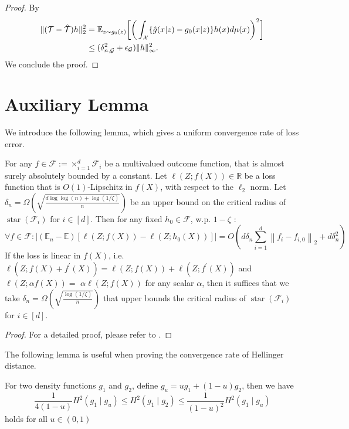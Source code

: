 \begin{proof}
By
    \begin{align*}
    \|({\mathcal{T}} - \hat{{\mathcal{T}}}) h\|_2^2 &= \mathbb{E}_{z\sim g_0(z)}\bigg[\bigg(\int_{\mathcal{X}} \{\hat{g}(x|z) - g_0(x| z)\}h(x)d\mu(x)\bigg)^2\bigg]\\
    &\leq (\delta_{n,\mathcal{G}}^2+\epsilon_{\mathcal{G}}) \|h\|_\infty^2 .
\end{align*}
We conclude the proof.
\end{proof}
\section{Auxiliary Lemma}
We introduce the following lemma, which gives a uniform convergence rate of loss error.
\begin{lemma}\label{lem:local-concen}
For any $f \in \mathcal{F}:=\times_{i=1}^d \mathcal{F}_i$ be a multivalued outcome function, that is almost surely absolutely bounded by a constant. Let $\ell(Z ; f(X)) \in \mathbb{R}$ be a loss function that is $O(1)$-Lipschitz in $f(X)$, with respect to the $\ell_2$ norm. Let $\delta_n=\Omega\left(\sqrt{\frac{d \log \log (n)+\log (1 / \zeta)}{n}}\right)$ be an upper bound on the critical radius of $\operatorname{star}\left(\mathcal{F}_i\right)$ for $i \in[d]$. Then for any fixed $h_0 \in \mathcal{F}$, w.p. $1-\zeta$ :
$$
\forall f \in \mathcal{F}:\left|\left(\mathbb{E}_n-\mathbb{E}\right)\left[\ell(Z ; f(X))-\ell\left(Z ; h_0(X)\right)\right]\right|=O\left(d \delta_n \sum_{i=1}^d\left\|f_i-f_{i, 0}\right\|_{2}+d \delta_n^2\right)
$$
If the loss is linear in $f(X)$, i.e. $\ell\left(Z ; f(X)+f^{\prime}(X)\right)=\ell(Z ; f(X))+\ell\left(Z ; f^{\prime}(X)\right)$ and $\ell(Z ; \alpha f(X))=$ $\alpha \ell(Z ; f(X))$ for any scalar $\alpha$, then it suffices that we take $\delta_n=\Omega\left(\sqrt{\frac{\log (1 / \zeta)}{n}}\right)$ that upper bounds the critical radius of $\operatorname{star}\left(\mathcal{F}_i\right)$ for $i \in[d]$.
\end{lemma}
\begin{proof}
    For a detailed proof, please refer to \cite{foster2019orthogonal}.
\end{proof}
The following lemma is useful when proving the convergence rate of Hellinger distance.
\begin{lemma}\label{lem:weighted-hellinger}
    For two density functions $g_1$ and $g_2$, define $g_u = u g_1 + (1-u) g_2$, then we have $$
    \frac{1}{4(1-u)}H^2(g_1\mid g_u) \leq H^2(g_1\mid g_2) \leq \frac{1}{(1-u)^2} H^2(g_1\mid g_u)
    $$
    holds for all $u\in(0,1)$
\end{lemma}
